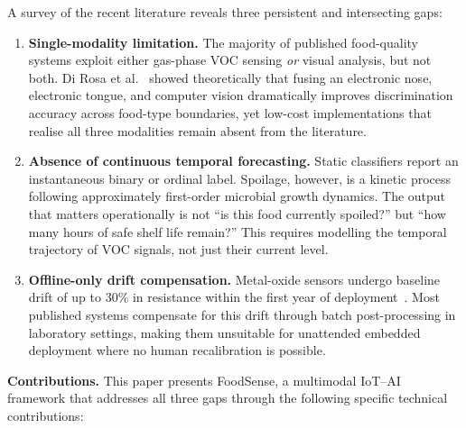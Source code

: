 \documentclass{ieeeaccess}
\begin{document}
A survey of the recent literature reveals three persistent and intersecting gaps:

\begin{enumerate}
  \item \textbf{Single-modality limitation.} The majority of published food-quality systems exploit either gas-phase VOC sensing \textit{or} visual analysis, but not both. Di Rosa et al.~\cite{DiRosa2017} showed theoretically that fusing an electronic nose, electronic tongue, and computer vision dramatically improves discrimination accuracy across food-type boundaries, yet low-cost implementations that realise all three modalities remain absent from the literature.

  \item \textbf{Absence of continuous temporal forecasting.} Static classifiers report an instantaneous binary or ordinal label. Spoilage, however, is a kinetic process following approximately first-order microbial growth dynamics. The output that matters operationally is not ``is this food currently spoiled?'' but ``how many hours of safe shelf life remain?'' This requires modelling the temporal trajectory of VOC signals, not just their current level.

  \item \textbf{Offline-only drift compensation.} Metal-oxide sensors undergo baseline drift of up to 30\% in resistance within the first year of deployment~\cite{Vergara2012}. Most published systems compensate for this drift through batch post-processing in laboratory settings, making them unsuitable for unattended embedded deployment where no human recalibration is possible.
\end{enumerate}

\textbf{Contributions.} This paper presents FoodSense, a multimodal IoT--AI framework that addresses all three gaps through the following specific technical contributions:
\end{document}
